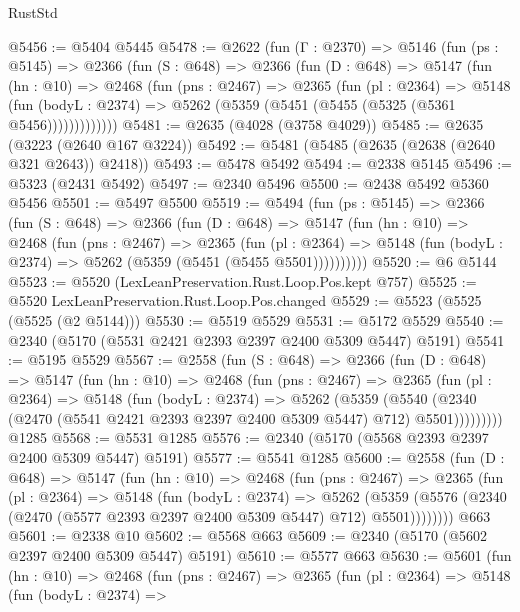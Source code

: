 \begin{lexlean}{RustStd}
\begin{coremodule}
@5456 := @5404 @5445
@5478 := @2622
    (fun (Γ : @2370) =>
    @5146
      (fun (ps : @5145) =>
      @2366
        (fun (S : @648) =>
        @2366
          (fun (D : @648) =>
          @5147
            (fun (hn : @10) =>
            @2468
              (fun (pns : @2467) =>
              @2365
                (fun (pl : @2364) =>
                @5148
                  (fun (bodyL : @2374) =>
                  @5262 (@5359 (@5451 (@5455 (@5325 (@5361 @5456)))))))))))))
@5481 := @2635 (@4028 (@3758 @4029))
@5485 := @2635 (@3223 (@2640 @167 @3224))
@5492 := @5481 (@5485 (@2635 (@2638 (@2640 @321 @2643)) @2418))
@5493 := @5478 @5492
@5494 := @2338 @5145
@5496 := @5323 (@2431 @5492)
@5497 := @2340 @5496
@5500 := @2438 @5492 @5360 @5456
@5501 := @5497 @5500
@5519 := @5494
    (fun (ps : @5145) =>
    @2366
      (fun (S : @648) =>
      @2366
        (fun (D : @648) =>
        @5147
          (fun (hn : @10) =>
          @2468
            (fun (pns : @2467) =>
            @2365
              (fun (pl : @2364) =>
              @5148 (fun (bodyL : @2374) => @5262 (@5359 (@5451 (@5455 @5501))))))))))
@5520 := @6 @5144
@5523 := @5520 (LexLeanPreservation.Rust.Loop.Pos.kept @757)
@5525 := @5520 LexLeanPreservation.Rust.Loop.Pos.changed
@5529 := @5523 (@5525 (@5525 (@2 @5144)))
@5530 := @5519 @5529
@5531 := @5172 @5529
@5540 := @2340 (@5170 (@5531 @2421 @2393 @2397 @2400 @5309 @5447) @5191)
@5541 := @5195 @5529
@5567 := @2558
    (fun (S : @648) =>
    @2366
      (fun (D : @648) =>
      @5147
        (fun (hn : @10) =>
        @2468
          (fun (pns : @2467) =>
          @2365
            (fun (pl : @2364) =>
            @5148
              (fun (bodyL : @2374) =>
              @5262
                (@5359
                  (@5540
                    (@2340 (@2470 (@5541 @2421 @2393 @2397 @2400 @5309 @5447) @712) @5501)))))))))
    @1285
@5568 := @5531 @1285
@5576 := @2340 (@5170 (@5568 @2393 @2397 @2400 @5309 @5447) @5191)
@5577 := @5541 @1285
@5600 := @2558
    (fun (D : @648) =>
    @5147
      (fun (hn : @10) =>
      @2468
        (fun (pns : @2467) =>
        @2365
          (fun (pl : @2364) =>
          @5148
            (fun (bodyL : @2374) =>
            @5262
              (@5359 (@5576 (@2340 (@2470 (@5577 @2393 @2397 @2400 @5309 @5447) @712) @5501))))))))
    @663
@5601 := @2338 @10
@5602 := @5568 @663
@5609 := @2340 (@5170 (@5602 @2397 @2400 @5309 @5447) @5191)
@5610 := @5577 @663
@5630 := @5601
    (fun (hn : @10) =>
    @2468
      (fun (pns : @2467) =>
      @2365
        (fun (pl : @2364) =>
        @5148
          (fun (bodyL : @2374) =>

\end{coremodule}
\end{lexlean}
